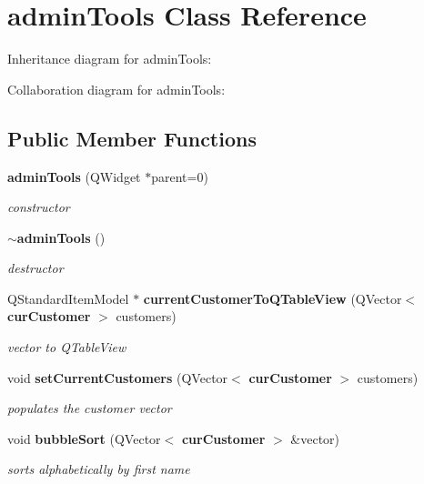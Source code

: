 \section{admin\+Tools Class Reference}
\label{classadmin_tools}


Inheritance diagram for admin\+Tools\+:


Collaboration diagram for admin\+Tools\+:
\subsection*{Public Member Functions}
\begin{DoxyCompactItemize}
\item 
\mbox{\label{classadmin_tools_a5c81931a9377831d3ea8a62297f9dbc3}} 
\textbf{ admin\+Tools} (Q\+Widget $\ast$parent=0)
\begin{DoxyCompactList}\small\item\em constructor \end{DoxyCompactList}\item 
\mbox{\label{classadmin_tools_a47389888cf3db497967e69b4ca70bc56}} 
\textbf{ $\sim$admin\+Tools} ()
\begin{DoxyCompactList}\small\item\em destructor \end{DoxyCompactList}\item 
\mbox{\label{classadmin_tools_a4d2c3a554bc55fd3f51ee0f9b41e8af0}} 
Q\+Standard\+Item\+Model $\ast$ \textbf{ current\+Customer\+To\+Q\+Table\+View} (Q\+Vector$<$ \textbf{ cur\+Customer} $>$ customers)
\begin{DoxyCompactList}\small\item\em vector to Q\+Table\+View \end{DoxyCompactList}\item 
\mbox{\label{classadmin_tools_a6ec77fdf3ec45119869d9931a7fa9339}} 
void \textbf{ set\+Current\+Customers} (Q\+Vector$<$ \textbf{ cur\+Customer} $>$ customers)
\begin{DoxyCompactList}\small\item\em populates the customer vector \end{DoxyCompactList}\item 
\mbox{\label{classadmin_tools_a086e8095615e706756e3f0cf2664f25e}} 
void \textbf{ bubble\+Sort} (Q\+Vector$<$ \textbf{ cur\+Customer} $>$ \&vector)
\begin{DoxyCompactList}\small\item\em sorts alphabetically by first name \end{DoxyCompactList}\item 

\end{DoxyCompactItemize}
